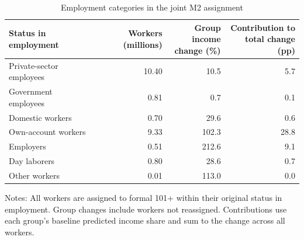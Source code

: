 \begin{table}[htbp]
\centering\small
\caption{Employment categories in the joint M2 assignment}
\label{tab:status-income-contributions}
\begin{tabular}{lrrr}
\toprule
Status in employment & Workers (millions) & \shortstack{Group income\\change (\%)} & \shortstack{Contribution to\\total change (pp)} \\
\midrule
Private-sector employees & 10.40 & 10.5 & 5.7 \\
Government employees & 0.81 & 0.7 & 0.1 \\
Domestic workers & 0.70 & 29.6 & 0.6 \\
Own-account workers & 9.33 & 102.3 & 28.8 \\
Employers & 0.51 & 212.6 & 9.1 \\
Day laborers & 0.80 & 28.6 & 0.7 \\
Other workers & 0.01 & 113.0 & 0.0 \\
\bottomrule
\end{tabular}
\par\vspace{0.3em}
\begin{minipage}{0.97\textwidth}\footnotesize
Notes: All workers are assigned to formal 101+ within their original status in employment. Group changes include workers not reassigned. Contributions use each group's baseline predicted income share and sum to the change across all workers.
\end{minipage}
\end{table}
